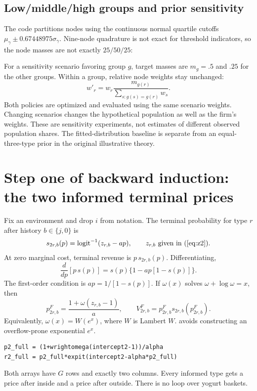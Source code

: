 \documentclass[11pt]{article}
\newcommand{\sig}{\operatorname{logit}^{-1}}
\newcommand{\code}[1]{\texttt{\detokenize{#1}}}
\begin{document}
\subsection{Low/middle/high groups and prior sensitivity}
The code partitions nodes using the continuous normal quartile cutoffs $\mu_\gamma\pm0.67448975\sigma_\gamma$. Nine-node quadrature is not exact for threshold indicators, so the node masses are not exactly $25/50/25$:
\begin{center}\end{center}
For a sensitivity scenario favoring group $g$, target masses are $m_g=.5$ and $.25$ for the other groups. Within a group, relative node weights stay unchanged:
\[
 w'_r=w_r\frac{m_{g(r)}}{\sum_{s:g(s)=g(r)}w_s}.
\]
Both policies are optimized and evaluated using the same scenario weights. Changing scenarios changes the hypothetical population as well as the firm's weights. These are sensitivity experiments, not estimates of different observed population shares. The fitted-distribution baseline is separate from an equal-three-type prior in the original illustrative theory.

\section{Step one of backward induction: the two informed terminal prices}
Fix an environment and drop $i$ from notation. The terminal probability for type $r$ after history $b\in\{j,0\}$ is
\[
 s_{2r,b}(p)=\sig(z_{r,b}-ap),\qquad z_{r,b}\text{ given in (\ref{eq:z2})}.
\]
At zero marginal cost, terminal revenue is $p\,s_{2r,b}(p)$. Differentiating,
\[
 \frac{d}{dp}[p\,s(p)]=s(p)\{1-ap[1-s(p)]\}.
\]
The first-order condition is $ap=1/[1-s(p)]$. If $\omega(x)$ solves $\omega+\log\omega=x$, then
\begin{equation}\label{eq:p2}
 p^F_{2r,b}=\frac{1+\omega(z_{r,b}-1)}a,
 \qquad V^F_{2r,b}=p^F_{2r,b}s_{2r,b}(p^F_{2r,b}).
\end{equation}
Equivalently, $\omega(x)=W(e^x)$, where $W$ is Lambert $W$. \code{wrightomega} avoids constructing an overflow-prone exponential $e^x$.
\begin{lstlisting}
p2_full = (1+wrightomega(intercept2-1))/alpha
r2_full = p2_full*expit(intercept2-alpha*p2_full)
\end{lstlisting}
Both arrays have $G$ rows and exactly two columns. Every informed type gets a price after inside and a price after outside. There is no loop over yogurt baskets.
\end{document}
